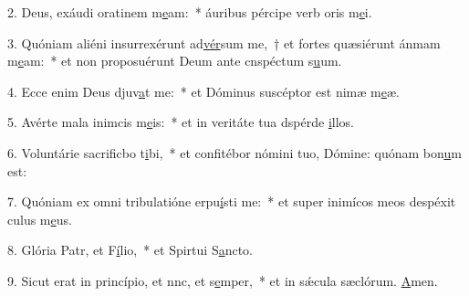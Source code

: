 2. Deus, exáudi oratinem m\uline{e}am:~* áuribus pércipe verb oris m\uline{e}i.\par 
3. Quóniam aliéni insurrexérunt ad\uline{vér}sum me,~† et fortes quæsiérunt ánmam m\uline{e}am:~* et non proposuérunt Deum ante cnspéctum s\uline{u}um.\par 
4. Ecce enim Deus djuv\uline{a}t me:~* et Dóminus suscéptor est nimæ m\uline{e}æ.\par 
5. Avérte mala inimcis m\uline{e}is:~* et in veritáte tua dspérde \uline{i}llos.\par 
6. Voluntárie sacrificbo t\uline{i}bi,~* et confitébor nómini tuo, Dómine: quónam bon\uline{u}m est:\par 
7. Quóniam ex omni tribulatióne erpu\uline{í}sti me:~* et super inimícos meos despéxit culus m\uline{e}us.\par 
8. Glória Patr, et F\uline{í}lio,~* et Spirtui S\uline{a}ncto.\par 
9. Sicut erat in princípio, et nnc, et s\uline{e}mper,~* et in sǽcula sæclórum. \uline{A}men.\par 
